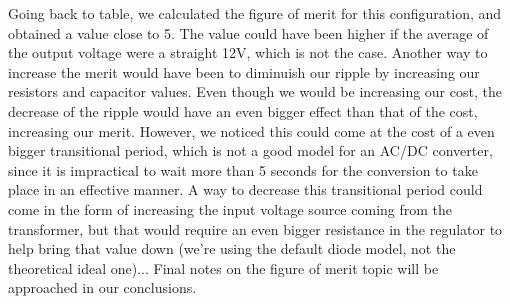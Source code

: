 Going back to table, we calculated the figure of merit for this configuration, and obtained a value close to 5. The value could have been higher if the average of the output voltage were a straight 12V, which is not the case. Another way to increase the merit would have been to diminuish our ripple by increasing our resistors and capacitor values. Even though we would be increasing our cost, the decrease of the ripple would have an even bigger effect than that of the cost, increasing our merit. However, we noticed this could come at the cost of a even bigger transitional period, which is not a good model for an AC/DC converter, since it is impractical to wait more than 5 seconds for the conversion to take place in an effective manner. A way to decrease this transitional period could come in the form of increasing the input voltage source coming from the transformer, but that would require an even bigger resistance in the regulator to help bring that value down (we're using the default diode model, not the theoretical ideal one)... Final notes on the figure of merit topic will be approached in our conclusions.

\par
